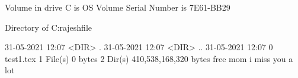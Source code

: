  Volume in drive C is OS
 Volume Serial Number is 7E61-BB29

 Directory of C:\Users\Bomagouni rajesh\OneDrive\Desktop\project file

31-05-2021  12:07    <DIR>          .
31-05-2021  12:07    <DIR>          ..
31-05-2021  12:07                 0 test1.tex
               1 File(s)              0 bytes
               2 Dir(s)  410,538,168,320 bytes free
mom i miss you a lot 
 
